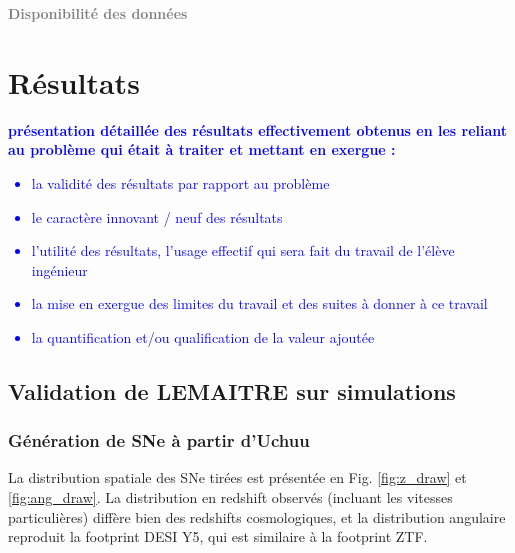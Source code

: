 \documentclass{book}
\newcommand{\todo}[1]{{\textcolor{gray}{\bf \large #1}}}
\newcommand{\consignes}[1]{{\textcolor{blue}{\bf \large #1}}}
\begin{document}
\todo{Disponibilité des données}



\chapter{Résultats}
\consignes{présentation détaillée des résultats effectivement obtenus en les reliant au problème qui était à traiter et mettant en exergue :
\begin{itemize}
\item la validité des résultats par rapport au problème
\item le caractère innovant / neuf des résultats
\item l’utilité des résultats, l’usage effectif qui sera fait du travail de l’élève ingénieur
\item la mise en exergue des limites du travail et des suites à donner à ce travail
\item la quantification et/ou qualification de la valeur ajoutée
\end{itemize}}


\section{Validation de LEMAITRE sur simulations}

\subsection{Génération de SNe à partir d'Uchuu}

La distribution spatiale des SNe tirées est présentée en Fig. \ref{fig:z_draw} et \ref{fig:ang_draw}. La distribution en redshift observés (incluant les vitesses particulières) diffère bien des redshifts cosmologiques, et la distribution angulaire reproduit la footprint DESI Y5, qui est similaire à la footprint ZTF.
\end{document}
